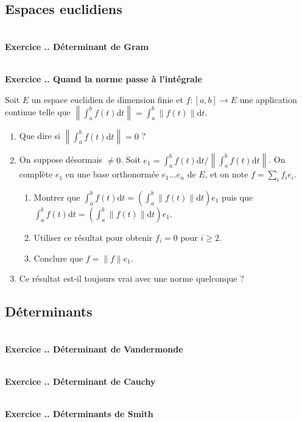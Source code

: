 \documentclass{article}
\newcommand{\di}{\mathrm{d}}
\newcounter{exo}
\newcommand{\exercice}[1][\null]{\textbf{\\ Exercice \thesection.\theexo. #1} \addtocounter{exo}{1}}
\begin{document}
\subsection{Espaces euclidiens}

\exercice[Déterminant de Gram]

\exercice[Quand la norme passe à l'intégrale]

Soit $E$ un espace euclidien de dimension finie et $f : [a,b] \rightarrow E$ une application continue telle que $\displaystyle \left\lVert\int_a^b f(t) \di t \right\lVert = \int_a^b \lVert f(t)\lVert \di t$.

\begin{enumerate}

\item Que dire si $\left\lVert\int_a^b f(t) \di t \right\lVert = 0$ ?

\item On suppose désormais $\neq 0$. Soit $e_1 = \int_a^b f(t) \di t \Big/  \left\lVert\int_a^b f(t) \di t \right\lVert $. On complète $e_1$ en une base orthonormée $e_1 \dots e_n$ de $E$, et on note $f = \sum_i f_i e_i$.
\begin{enumerate}

\item Montrer que $\int_a^b f(t) \di t = (\int_a^b \lVert f(t) \rVert \di t) e_1$ puis que $\int_a^b f(t) \di t = (\int_a^b \lVert f(t) \rVert \di t) e_1$.

\item Utiliser ce résultat pour obtenir $f_i = 0$ pour $i \ge 2$.

\item Conclure que $f = \lVert f \lVert e_1$.

\end{enumerate}

\item Ce résultat est-il toujours vrai avec une norme quelconque ?

\end{enumerate}






\subsection{Déterminants}

\exercice[Déterminant de Vandermonde]

\exercice[Déterminant de Cauchy]

\exercice[Déterminants de Smith]
\end{document}
